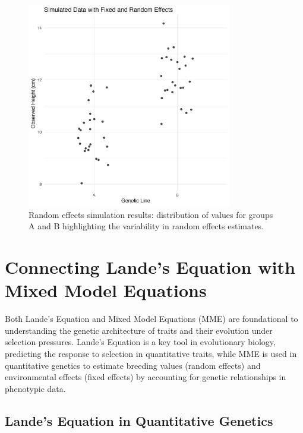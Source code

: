 \documentclass[12pt,a4paper]{article}
\begin{document}
\begin{figure}[h]
    \centering
    \includegraphics[width=0.8\textwidth]{random_effects_simulation.png}
    \caption{Random effects simulation results: distribution of values for groups A and B highlighting the variability in random effects estimates.}
    \label{fig:random-effects-simulation}
\end{figure}

\section{Connecting Lande's Equation with Mixed Model Equations}

Both Lande’s Equation and Mixed Model Equations (MME) are foundational to understanding the genetic architecture of traits and their evolution under selection pressures. Lande’s Equation is a key tool in evolutionary biology, predicting the response to selection in quantitative traits, while MME is used in quantitative genetics to estimate breeding values (random effects) and environmental effects (fixed effects) by accounting for genetic relationships in phenotypic data.

\subsection{Lande's Equation in Quantitative Genetics}
\end{document}
